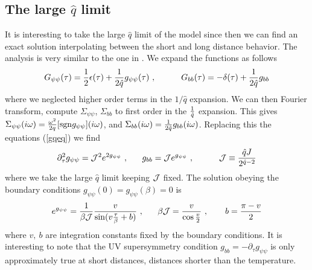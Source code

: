 \documentclass[aps,pre,preprint,onecolumn,citeautoscript,superscriptaddress,nofootinbib,eqsecnum]{revtex4-1}
\def\nref#1{(\ref{#1})}
\def\be{\begin{equation}}
\def\ee{\end{equation}}
\def\sign{{\rm sgn}}
\def\la{\label}
\begin{document}
\subsection{The large $\hat q $ limit } 

 
It is interesting to take the large $\hat q$ limit of the model since then we can find an exact solution 
interpolating between the short and long distance behavior. The analysis is very similar to the one in \cite{JMDS16}. 
We expand the functions as follows 
\be
G_{\psi \psi}(\tau) = { 1\over 2 } \epsilon(\tau)  +  { 1 \over 2 \hat q } g_{\psi \psi}(\tau)  ~,~~~~~~~~~G_{bb}(\tau) = - \delta(\tau) + {1\over 2 \hat q } g_{bb} 
 \label{Gqexp} \ee
 where we neglected higher order terms in the $1/\hat q $ expansion. 
 We can then Fourier transform, compute $\Sigma_{\psi \psi}$, $\Sigma_{bb}$ to first order in the ${1 \over \hat q}$ expansion. This gives $\Sigma_{\psi \psi}(i\omega) = 
 { \omega^2 \over 2 q} [ \sign g_{\psi \psi}](i\omega) $, and $\Sigma_{bb}(i \omega) ={ 1 \over 2 \hat q } g_{bb}(i \omega)$. 
  Replacing this   the equations \nref{gqeq} we find 
  \be
  \partial_\tau^2 g_{\psi \psi} =  {\cal J }^2 e^{ 2 g_{\psi \psi} } ~,~~~~~g_{bb} = { \cal J } e^{g_{\psi \psi} } ~,~~~~~~~~~{ \cal J } \equiv { \hat q J \over 2^{ \hat q - 2 } } 
  \ee
  where we take the large $\hat q$ limit keeping ${\cal J }$ fixed. 
  The solution obeying the boundary conditions $g_{\psi \psi}(0) = g_{\psi \psi}(\beta ) =0$ is 
  \be \la{soleq}
  e^{ g_{\psi \psi}} = { 1 \over \beta {\cal J } } { v \over \sin ( v { \tau \over \beta }  + b)}   ~,~~~~~{ \beta \cal J } = { v \over \cos { v \over 2 } }~,~~~~~~b = { \pi - v \over 2} 
  \ee
 where $v,~b$ are integration constants fixed by the boundary  conditions.  
  It is interesting to note that the UV supersymmetry condition $g_{bb} = - \partial_\tau g_{\psi \psi}$ is only approximately true 
  at short distances, distances shorter than the temperature. 
  
\end{document}
